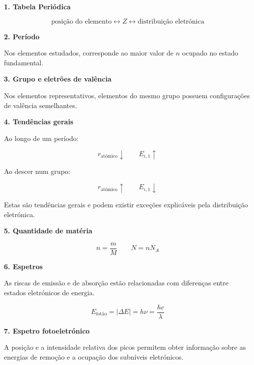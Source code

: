 \documentclass[11pt,a4paper]{article}
\begin{document}
\begin{tcolorbox}[
    enhanced,
    breakable,
    colback=eugray,
    colframe=eudark,
    title=\textbf{Ideias fundamentais}
]

\textbf{1. Tabela Periódica}

\[
\boxed{\text{posição do elemento}\longleftrightarrow Z\longleftrightarrow\text{distribuição eletrónica}}
\]

\textbf{2. Período}

Nos elementos estudados, corresponde ao maior valor de \(n\) ocupado no estado fundamental.

\textbf{3. Grupo e eletrões de valência}

Nos elementos representativos, elementos do mesmo grupo possuem configurações de valência semelhantes.

\textbf{4. Tendências gerais}

Ao longo de um período:

\[
r_{\text{atómico}}\downarrow
\qquad
E_{i,1}\uparrow
\]

Ao descer num grupo:

\[
r_{\text{atómico}}\uparrow
\qquad
E_{i,1}\downarrow
\]

Estas são tendências gerais e podem existir exceções explicáveis pela distribuição eletrónica.

\textbf{5. Quantidade de matéria}

\[
\boxed{n=\frac{m}{M}}
\qquad
\boxed{N=nN_A}
\]

\textbf{6. Espetros}

As riscas de emissão e de absorção estão relacionadas com diferenças entre estados eletrónicos de energia.

\[
\boxed{E_{\text{fotão}}=|\Delta E|=h\nu=\frac{hc}{\lambda}}
\]

\textbf{7. Espetro fotoeletrónico}

A posição e a intensidade relativa dos picos permitem obter informação sobre as energias de remoção e a ocupação dos subníveis eletrónicos.

\end{tcolorbox}

\vfill

\begin{center}
\end{center}
\end{document}
